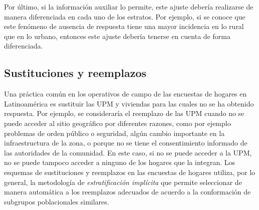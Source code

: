 Por último, si la información auxiliar lo permite, este ajuste debería realizarse de manera diferenciada en cada uno de los estratos. Por ejemplo, si se conoce que este fenómeno de ausencia de respuesta tiene una mayor incidencia en lo rural que en lo urbano, entonces este ajuste debería tenerse en cuenta de forma diferenciada.

\hypertarget{sustituciones-y-reemplazos}{%
\subsection{Sustituciones y reemplazos}\label{sustituciones-y-reemplazos}}

Una práctica común en los operativos de campo de las encuestas de hogares en Latinoamérica es sustituir las UPM y viviendas para las cuales no se ha obtenido respuesta. Por ejemplo, se consideraría el reemplazo de las UPM cuando no se puede acceder al sitio geográfico por diferentes razones, como por ejemplo problemas de orden público o seguridad, algún cambio importante en la infraestructura de la zona, o porque no se tiene el consentimiento informado de las autoridades de la comunidad. En este caso, si no se puede acceder a la UPM, no se puede tampoco acceder a ninguno de los hogares que la integran. Los esquemas de sustituciones y reemplazos en las encuestas de hogares utiliza, por lo general, la metodología de \emph{estratificación implícita} que permite seleccionar de manera automática a los reemplazos adecuados de acuerdo a la conformación de subgrupos poblacionales similares.

